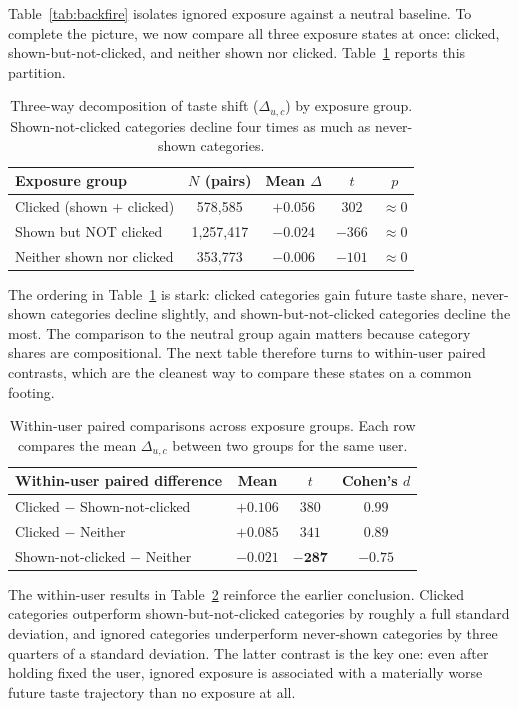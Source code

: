 \documentclass[11pt]{article}
\begin{document}
Table~\ref{tab:backfire} isolates ignored exposure against a neutral baseline. To complete the picture, we now compare all three exposure states at once: clicked, shown-but-not-clicked, and neither shown nor clicked. Table~\ref{tab:threeway} reports this partition.
\begin{table}[ht]
\centering
\caption{Three-way decomposition of taste shift ($\Delta_{u,c}$) by exposure group. Shown-not-clicked categories decline four times as much as never-shown categories.}
\label{tab:threeway}
\begin{tabular}{lcccc}
\toprule
Exposure group & $N$ (pairs) & Mean $\Delta$ & $t$ & $p$ \\
\midrule
Clicked (shown + clicked) & 578,585 & $+0.056$ & $302$ & $\approx 0$ \\
Shown but NOT clicked & 1,257,417 & $-0.024$ & $-366$ & $\approx 0$ \\
Neither shown nor clicked & 353,773 & $-0.006$ & $-101$ & $\approx 0$ \\
\bottomrule
\end{tabular}
\end{table}
\FloatBarrier

The ordering in Table~\ref{tab:threeway} is stark: clicked categories gain future taste share, never-shown categories decline slightly, and shown-but-not-clicked categories decline the most. The comparison to the neutral group again matters because category shares are compositional. The next table therefore turns to within-user paired contrasts, which are the cleanest way to compare these states on a common footing.
\begin{table}[ht]
\centering
\caption{Within-user paired comparisons across exposure groups. Each row compares the mean $\Delta_{u,c}$ between two groups for the same user.}
\label{tab:paired}
\begin{tabular}{lccc}
\toprule
Within-user paired difference & Mean & $t$ & Cohen's $d$ \\
\midrule
Clicked $-$ Shown-not-clicked & $+0.106$ & $380$ & $0.99$ \\
Clicked $-$ Neither & $+0.085$ & $341$ & $0.89$ \\
Shown-not-clicked $-$ Neither & $\mathbf{-0.021}$ & $\mathbf{-287}$ & $\mathbf{-0.75}$ \\
\bottomrule
\end{tabular}
\end{table}
\FloatBarrier

The within-user results in Table~\ref{tab:paired} reinforce the earlier conclusion. Clicked categories outperform shown-but-not-clicked categories by roughly a full standard deviation, and ignored categories underperform never-shown categories by three quarters of a standard deviation. The latter contrast is the key one: even after holding fixed the user, ignored exposure is associated with a materially worse future taste trajectory than no exposure at all.
\end{document}
